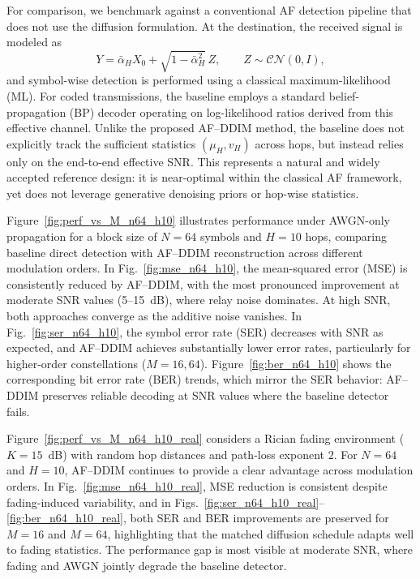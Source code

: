 \documentclass[journal]{IEEEtran}
\begin{document}
For comparison, we benchmark against a conventional AF detection pipeline that does not use the diffusion formulation. 
At the destination, the received signal is modeled as 
\[
Y = \bar\alpha_H X_0 + \sqrt{1-\bar\alpha_H^2}\, Z,
\qquad Z \sim \mathcal{CN}(0,I),
\]
and symbol-wise detection is performed using a classical maximum-likelihood (ML). 
For coded transmissions, the baseline employs a standard belief-propagation (BP) decoder operating on log-likelihood ratios derived from this effective channel. 
Unlike the proposed AF--DDIM method, the baseline does not explicitly track the sufficient statistics $(\mu_H,v_H)$ across hops, but instead relies only on the end-to-end effective SNR. 
This represents a natural and widely accepted reference design: it is near-optimal within the classical AF framework, yet does not leverage generative denoising priors or hop-wise statistics.



Figure~\ref{fig:perf_vs_M_n64_h10} illustrates performance under AWGN-only propagation for a block size of $N=64$ symbols and $H=10$ hops, comparing baseline direct detection with AF--DDIM reconstruction across different modulation orders. In Fig.~\ref{fig:mse_n64_h10}, the mean-squared error (MSE) is consistently reduced by AF--DDIM, with the most pronounced improvement at moderate SNR values (5--15~dB), where relay noise dominates. At high SNR, both approaches converge as the additive noise vanishes. In Fig.~\ref{fig:ser_n64_h10}, the symbol error rate (SER) decreases with SNR as expected, and AF--DDIM achieves substantially lower error rates, particularly for higher-order constellations ($M=16,64$). Figure~\ref{fig:ber_n64_h10} shows the corresponding bit error rate (BER) trends, which mirror the SER behavior: AF--DDIM preserves reliable decoding at SNR values where the baseline detector fails. 



Figure~\ref{fig:perf_vs_M_n64_h10_real} considers a Rician fading environment ($K=15$~dB) with random hop distances and path-loss exponent $2$. 
For $N=64$ and $H=10$, AF--DDIM continues to provide a clear advantage across modulation orders. 
In Fig.~\ref{fig:mse_n64_h10_real}, MSE reduction is consistent despite fading-induced variability, 
and in Figs.~\ref{fig:ser_n64_h10_real}--\ref{fig:ber_n64_h10_real}, both SER and BER improvements are preserved for $M=16$ and $M=64$, 
highlighting that the matched diffusion schedule adapts well to fading statistics. 
The performance gap is most visible at moderate SNR, where fading and AWGN jointly degrade the baseline detector.
\end{document}
